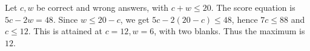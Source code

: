 Let $c,w$ be correct and wrong answers, with $c+w\le20$. The score equation is $5c-2w=48$. Since $w\le20-c$, we get $5c-2(20-c)\le48$, hence $7c\le88$ and $c\le12$. This is attained at $c=12,w=6$, with two blanks. Thus the maximum is $\boxed{12}$.
